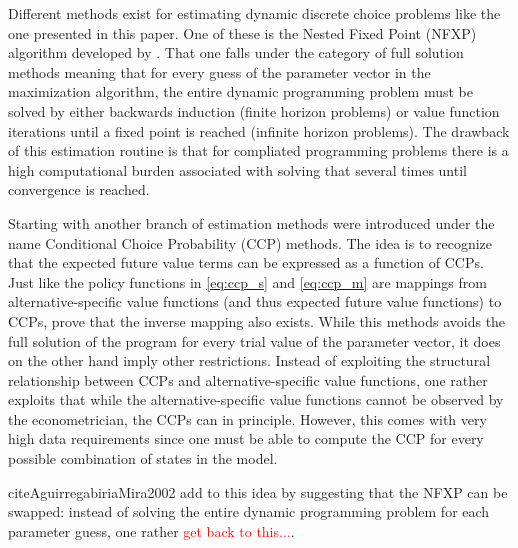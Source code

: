 Different methods exist for estimating dynamic discrete choice problems like the one presented in this paper. One of these is the Nested Fixed Point (NFXP) algorithm developed by \cite{Rust1987}. That one falls under the category of full solution methods meaning that for every guess of the parameter vector in the maximization algorithm, the entire dynamic programming problem must be solved by either backwards induction (finite horizon problems) or value function iterations until a fixed point is reached (infinite horizon problems). The drawback of this estimation routine is that for compliated programming problems there is a high computational burden associated with solving that several times until convergence is reached. 

Starting with \cite{Hotzetal1993} another branch of estimation methods were introduced under the name Conditional Choice Probability (CCP) methods. The idea is to recognize that the expected future value terms can be expressed as a function of CCPs. Just like the policy functions in \eqref{eq:ccp_s} and \eqref{eq:ccp_m} are mappings from alternative-specific value functions (and thus expected future value functions) to CCPs, \cite{Hotzetal1993} prove that the inverse mapping also exists. While this methods avoids the full solution of the program for every trial value of the parameter vector, it does on the other hand imply other restrictions. Instead of exploiting the structural relationship between CCPs and alternative-specific value functions, one rather exploits that while the alternative-specific value functions cannot be observed by the econometrician, the CCPs can in principle. However, this comes with very high data requirements since one must be able to compute the CCP for every possible combination of states in the model. 

cite{AguirregabiriaMira2002} add to this idea by suggesting that the NFXP can be swapped: instead of solving the entire dynamic programming problem for each parameter guess, one rather \textcolor{red}{get back to this...}.

